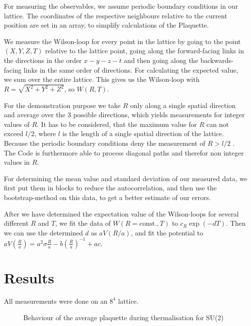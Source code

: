 \documentclass[%
 reprint,
 amsmath,amssymb,
 aps,
]{revtex4-1}
\begin{document}
For measuring the observables, we assume periodic boundary conditions in our lattice. The coordinates of the respective neighbours relative to the current position are set in an array, to simplify calculations of the Plaquette.

We measure the Wilson-loop for every point in the lattice by going to the point $(X,Y,Z,T)$ relative to the lattice point, going along the forward-facing links in the directions in the order $x-y-z-t$ and then going along the backwards-facing links in the same order of directions. For calculating the expected value, we sum over the entire lattice. This gives us the Wilson-loop with $R=\sqrt{X^2+Y^2+Z^2}$, so $W(R, T)$. 

For the demonstration purpose we take $R$ only along a single spatial direction and average over the $3$ possible directions, which yields measurements for integer values of $R$. It has to be considered, that the maximum value for $R$ can not exceed $l/2$, where $l$ is the length of a single spatial direction of the lattice. Because the periodic boundary conditions deny the measurement of $R>l/2$ .
The Code is furthermore able to process diagonal paths and therefor non integer values in $R$. 

For determining the mean value and standard deviation of our measured data, we first put them in blocks to reduce the autocorrelation, and then use the bootstrap-method on this data, to get a better estimate of our errors.

After we have determined the expectation value of the Wilson-loops for several different $R$ and $T$, we fit the data of $W(R=\text{const.}, T)$ to $c_R\exp(-dT)$. Then we can use the determined $d$ as $aV(R/a)$, and fit the potential to $aV\left(\frac{R}{a}\right)=a^2\sigma \frac{R}{a}-b\left(\frac{R}{a}\right)^{-1}+ac$.

\section{Results}

All measurements were done on an $8^4$ lattice.

 \begin{figure}
 	\centering

\caption[Behaviour of the plaquette for SU(2)]{Behaviour of the average plaquette during thermalisation for SU(2)}
\label{fig:comparisoncreutz}
\end{figure} 

\end{document}
